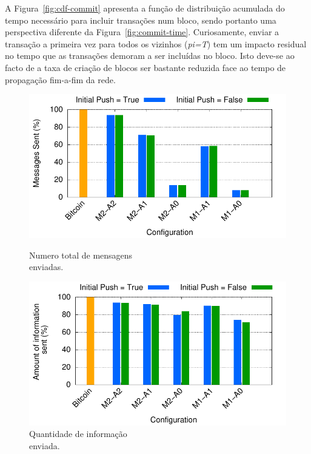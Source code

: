 A Figura~\ref{fig:cdf-commit} apresenta a função de distribuição acumulada do tempo necessário para incluir transações num bloco, sendo portanto uma perspectiva diferente da Figura~\ref{fig:commit-time}.
Curiosamente, enviar a transação a primeira vez para todos os vizinhos (\emph{pi=T}) tem um impacto residual no tempo que as transações demoram a ser incluídas no bloco.
Isto deve-se ao facto de a taxa de criação de blocos ser bastante reduzida face ao tempo de propagação fim-a-fim da rede.

\begin{figure}
\centering
\begin{minipage}{.5\textwidth}
  	\centering
  	\includegraphics[width=1\textwidth]{plots/imp/msg-sent.pdf}
	\caption{Numero total de mensagens \\\hspace{\textwidth} enviadas.}
	\label{fig:msg-sent}
\end{minipage}%
\begin{minipage}{.5\textwidth}
  	\centering
  	\includegraphics[width=1\textwidth]{plots/imp/mb-sent.pdf}
	\caption{Quantidade de informação \\\hspace{\textwidth} enviada.}
	\label{fig:mb-sent}
\end{minipage}
\vspace{-0.5cm}
\end{figure}

